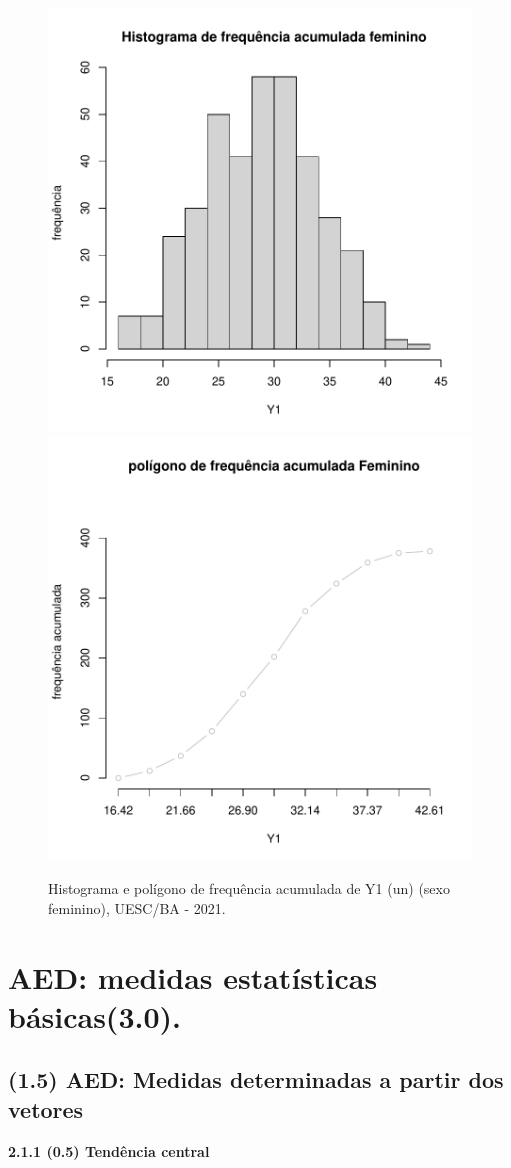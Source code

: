 \documentclass[12pt]{article}\usepackage[]{graphicx}\usepackage[]{color}
\newenvironment{knitrout}{}{} %
\begin{document}
\begin{figure}[!h]
\label{figura:Histograma-Poligono-F}
\begin{knitrout}
\color{fgcolor}

{\centering \includegraphics[width=.4\linewidth]{figure/minimal-Histograma-Poligono-Fem-1} 
\includegraphics[width=.4\linewidth]{figure/minimal-Histograma-Poligono-Fem-2} 

}


\end{knitrout}
\caption{Histograma e polígono de frequência acumulada de Y1 (un) (sexo feminino), UESC/BA - 2021.
}
\end{figure}
\pagebreak

\section{AED: medidas estatísticas básicas(3.0).}

    \subsection{(1.5) AED: Medidas determinadas a partir dos vetores}
    
    \textbf{ 2.1.1 (0.5) Tendência central}

\end{document}
